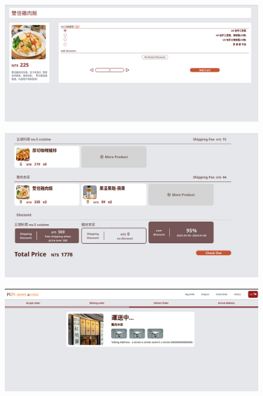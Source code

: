 \documentclass[a4paper, 12pt]{article}
\begin{document}
\newline
\newpage
{}
\begin{figure}[hp]
    \centerline{\includegraphics[width=40em]{gui-snapshot/customer/item.png}}
    \label{fig:enter-label}
\end{figure}
\newline
{}
\begin{figure}[hp]
    \centerline{\includegraphics[width=40em]{gui-snapshot/customer/cart.png}}
    \label{fig:enter-label}
\end{figure}
\newpage
{}
\begin{figure}[hp]
    \centerline{\includegraphics[width=40em]{gui-snapshot/customer/check-order.png}}
    \label{fig:enter-label}
\end{figure}
\end{document}
